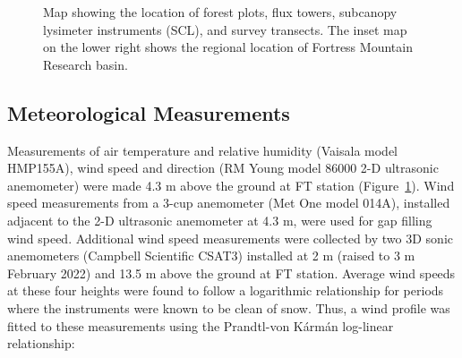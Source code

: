 \documentclass[
  letterpaper,
  DIV=11,
  numbers=noendperiod]{scrartcl}
\begin{document}
\begin{figure}


\caption{\label{fig-site-map}Map showing the location of forest plots,
flux towers, subcanopy lysimeter instruments (SCL), and survey
transects. The inset map on the lower right shows the regional location
of Fortress Mountain Research basin.}

\end{figure}%

\subsection{Meteorological
Measurements}\label{meteorological-measurements}

Measurements of air temperature and relative humidity (Vaisala model
HMP155A), wind speed and direction (RM Young model 86000 2-D ultrasonic
anemometer) were made 4.3 m above the ground at FT station
(Figure~\ref{fig-site-map}). Wind speed measurements from a 3-cup
anemometer (Met One model 014A), installed adjacent to the 2-D
ultrasonic anemometer at 4.3 m, were used for gap filling wind speed.
Additional wind speed measurements were collected by two 3D sonic
anemometers (Campbell Scientific CSAT3) installed at 2 m (raised to 3 m
February 2022) and 13.5 m above the ground at FT station. Average wind
speeds at these four heights were found to follow a logarithmic
relationship for periods where the instruments were known to be clean of
snow. Thus, a wind profile was fitted to these measurements using the
Prandtl-von Kármán log-linear relationship:
\end{document}
